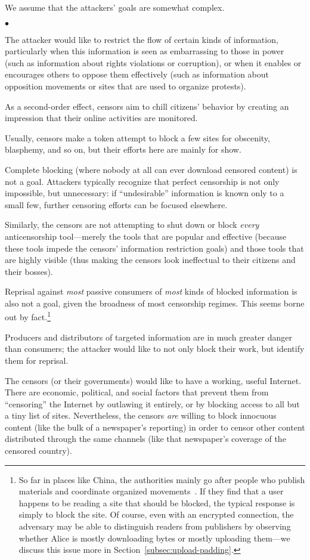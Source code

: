 \documentclass{llncs}
\newenvironment{tightlist}{\begin{list}{$\bullet$}{
  \setlength{\itemsep}{0mm}
    \setlength{\parsep}{0mm}
    }}{\end{list}}
\begin{document}
We assume that the attackers' goals are somewhat complex.
\begin{tightlist}
\item The attacker would like to restrict the flow of certain kinds of
  information, particularly when this information is seen as embarrassing to
  those in power (such as information about rights violations or corruption),
  or when it enables or encourages others to oppose them effectively (such as
  information about opposition movements or sites that are used to organize
  protests).
\item As a second-order effect, censors aim to chill citizens' behavior by
  creating an impression that their online activities are monitored.
\item Usually, censors make a token attempt to block a few sites for
  obscenity, blasphemy, and so on, but their efforts here are mainly for
  show.
\item Complete blocking (where nobody at all can ever download censored
  content) is not a
  goal. Attackers typically recognize that perfect censorship is not only
  impossible, but unnecessary: if ``undesirable'' information is known only
  to a small few, further censoring efforts can be focused elsewhere.
\item Similarly, the censors are not attempting to shut down or block {\it
  every} anticensorship tool---merely the tools that are popular and
  effective (because these tools impede the censors' information restriction
  goals) and those tools that are highly visible (thus making the censors
  look ineffectual to their citizens and their bosses).
\item Reprisal against {\it most} passive consumers of {\it most} kinds of
  blocked information is also not a goal, given the broadness of most
  censorship regimes. This seems borne out by fact.\footnote{So far in places
  like China, the authorities mainly go after people who publish materials
  and coordinate organized movements~\cite{mackinnon-personal}.
  If they find that a
  user happens to be reading a site that should be blocked, the typical
  response is simply to block the site. Of course, even with an encrypted
  connection, the adversary may be able to distinguish readers from
  publishers by observing whether Alice is mostly downloading bytes or mostly
  uploading them---we discuss this issue more in
  Section~\ref{subsec:upload-padding}.}
\item Producers and distributors of targeted information are in much
  greater danger than consumers; the attacker would like to not only block
  their work, but identify them for reprisal.
\item The censors (or their governments) would like to have a working, useful
  Internet. There are economic, political, and social factors that prevent
  them from ``censoring'' the Internet by outlawing it entirely, or by
  blocking access to all but a tiny list of sites.
  Nevertheless, the censors {\it are} willing to block innocuous content
  (like the bulk of a newspaper's reporting) in order to censor other content
  distributed through the same channels (like that newspaper's coverage of
  the censored country).
\end{tightlist}
\end{document}
